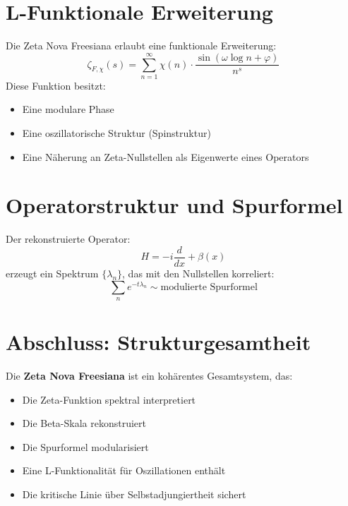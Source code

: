 \documentclass[12pt]{article}
\begin{document}
\section{L-Funktionale Erweiterung}
Die Zeta Nova Freesiana erlaubt eine funktionale Erweiterung:
\[
\zeta_{F,\chi}(s) = \sum_{n=1}^\infty \chi(n) \cdot \frac{\sin(\omega \log n + \varphi)}{n^s}
\]
Diese Funktion besitzt:
\begin{itemize}
    \item Eine modulare Phase
    \item Eine oszillatorische Struktur (Spinstruktur)
    \item Eine Näherung an Zeta-Nullstellen als Eigenwerte eines Operators
\end{itemize}

\section{Operatorstruktur und Spurformel}
Der rekonstruierte Operator:
\[
H = -i \frac{d}{dx} + \beta(x)
\]
erzeugt ein Spektrum \( \{ \lambda_n \} \), das mit den Nullstellen korreliert:
\[
\sum_n e^{-t \lambda_n} \sim \text{modulierte Spurformel}
\]

\section{Abschluss: Strukturgesamtheit}
Die \textbf{Zeta Nova Freesiana} ist ein kohärentes Gesamtsystem, das:
\begin{itemize}
    \item Die Zeta-Funktion spektral interpretiert
    \item Die Beta-Skala rekonstruiert
    \item Die Spurformel modularisiert
    \item Eine L-Funktionalität für Oszillationen enthält
    \item Die kritische Linie über Selbstadjungiertheit sichert
\end{itemize}
\end{document}
